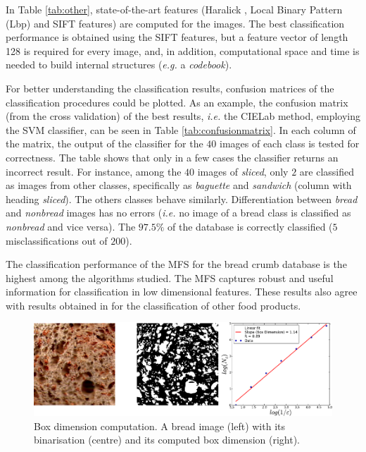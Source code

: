 \documentclass[spanish,a4paper,11pt,oneside,links]{report}
\begin{document}
In Table \ref{tab:other}, state-of-the-art features (Haralick \cite{Haralick73}, Local Binary Pattern (Lbp) \cite{Ojala96} and SIFT \cite{Lowe2004} features) are computed for the images. The best classification performance is obtained using the SIFT features, but a feature vector of length 128 is required for every image, and, in addition, computational space and time is needed to build internal structures ({\em e.g.} a {\em codebook}). 

For better understanding the classification results, confusion matrices of the classification procedures could be plotted. As an example, the confusion matrix (from the cross validation) of the best results, {\em i.e.} the CIELab method, employing the SVM classifier, can be seen in Table \ref{tab:confusionmatrix}. In each column of the matrix, the output of the classifier for the $40$ images of each class is tested for correctness. The table shows that only in a few cases the classifier returns an incorrect result. For instance, among the $40$ images of {\em sliced}, only $2$ are  classified as images from other classes, specifically as {\em baguette} and {\em sandwich} (column with heading {\em sliced}). The others classes behave similarly. Differentiation between {\em bread} and {\em nonbread} images has no errors ({\em i.e.} no image of a bread class is classified as {\em nonbread} and vice versa). The $97.5\%$ of the database is correctly classified ($5$ misclassifications out of $200$).

The classification performance of the MFS for the bread crumb database is the highest a\-mong the algorithms studied. The MFS captures robust and useful information for classification in low dimensional features. These results also agree with results obtained in \cite{Bosch2011} for the classification of other food products.

\begin{figure}[h!]
\centering
\includegraphics{dimensionbox}
\caption{Box dimension computation. A bread image (left) with its binarisation (centre) and its computed box dimension (right).}
\label{fig:fitbox}
\end{figure}
\end{document}
